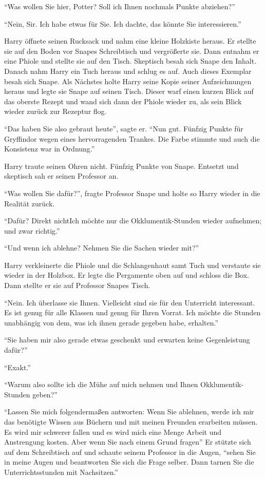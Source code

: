 \enquote{Was wollen Sie hier, Potter? Soll ich Ihnen nochmals Punkte abziehen?}

\enquote{Nein, Sir. Ich habe etwas für Sie. Ich dachte, das könnte Sie interessieren.}

Harry öffnete seinen Rucksack und nahm eine kleine Holzkiste heraus. Er stellte sie auf den Boden vor Snapes Schreibtisch und vergrößerte sie. Dann entnahm er eine Phiole und stellte sie auf den Tisch. Skeptisch besah sich Snape den Inhalt. Danach nahm Harry ein Tuch heraus und schlug es auf. Auch dieses Exemplar besah sich Snape. Als Nächstes holte Harry seine Kopie seiner Aufzeichnungen heraus und legte sie Snape auf seinen Tisch. Dieser warf einen kurzen Blick auf das oberste Rezept und wand sich dann der Phiole wieder zu, als sein Blick wieder zurück zur Rezeptur flog.

\enquote{Das haben Sie also gebraut heute}, sagte er. \enquote{Nun gut. Fünfzig Punkte für Gryffindor wegen eines hervorragenden Trankes. Die Farbe stimmte und auch die Konsistenz war in Ordnung.}

Harry traute seinen Ohren nicht. Fünfzig Punkte von Snape. Entsetzt und skeptisch sah er seinen Professor an.

\enquote{Was wollen Sie dafür?}, fragte Professor Snape und holte so Harry wieder in die Realität zurück.

\enquote{Dafür? Direkt nicht\abs Ich möchte nur die Okklumentik-Stunden wieder aufnehmen; und zwar richtig.}

\enquote{Und wenn ich ablehne? Nehmen Sie die Sachen wieder mit?}

Harry verkleinerte die Phiole und die Schlangenhaut samt Tuch und verstaute sie wieder in der Holzbox. Er legte die Pergamente oben auf und schloss die Box. Dann stellte er sie auf Professor Snapes Tisch.

\enquote{Nein. Ich überlasse sie Ihnen. Vielleicht sind sie für den Unterricht interessant. Es ist genug für alle Klassen und genug für Ihren Vorrat. \gst Ich möchte die Stunden unabhängig von dem, was ich ihnen gerade gegeben habe, erhalten.}

\enquote{Sie haben mir also gerade etwas geschenkt und erwarten keine Gegenleistung dafür?}

\enquote{Exakt.}

\enquote{Warum also sollte ich die Mühe auf mich nehmen und Ihnen Okklumentik-Stunden geben?}

\enquote{Lassen Sie mich folgendermaßen antworten: Wenn Sie ablehnen, werde ich mir das benötigte Wissen aus Büchern und mit meinen Freunden erarbeiten müssen. Es wird mir schwerer fallen und es wird mich eine Menge Arbeit und Anstrengung kosten. Aber wenn Sie nach einem Grund fragen\abs} Er stützte sich auf dem Schreibtisch auf und schaute seinem Professor in die Augen, \enquote{sehen Sie in meine Augen und beantworten Sie sich die Frage selber. Dann tarnen Sie die Unterrichtsstunden mit Nachsitzen.}

